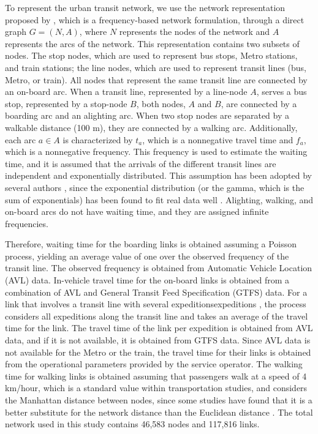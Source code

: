 \documentclass[12pt,a4paper]{article}
\begin{document}
To represent the urban transit network, we use the network representation proposed by \cite{cepeda2006frequency, spiess1989optimal}, which is a frequency-based network formulation, through a direct graph $G=(N,A)$, where $N$ represents the nodes of the network and $A$ represents the arcs of the network. This representation contains two subsets of nodes. The stop nodes, which are used to represent bus stops, Metro stations, and train stations; the line nodes, which are used to represent transit lines (bus, Metro, or train). All nodes that represent the same transit line are connected by an on-board arc. When a transit line, represented by a line-node $A$, serves a bus stop, represented by a stop-node $B$, both nodes, $A$ and $B$, are connected by a boarding arc and an alighting arc. When two stop nodes are separated by a walkable distance (100 m), they are connected by a walking arc. Additionally, each arc $a \in A$ is characterized by $t_{a}$, which is a nonnegative travel time and $f_{a}$, which is a nonnegative frequency. This frequency is used to estimate the waiting time, and it is assumed that the arrivals of the different transit lines are independent and exponentially distributed. This assumption has been adopted by several authors \citep{cepeda2006frequency, spiess1989optimal}, since the exponential distribution (or the gamma, which is the sum of exponentials) has been found to fit real data well \citep{guo2011modelling}. Alighting, walking, and on-board arcs do not have waiting time, and they are assigned infinite frequencies.

Therefore, waiting time for the boarding links is obtained assuming a Poisson process, yielding an average value of one over the observed frequency of the transit line. The observed frequency is obtained from Automatic Vehicle Location (AVL) data. In-vehicle travel time for the on-board links is obtained from a combination of AVL and General Transit Feed Specification (GTFS) data. For a link that involves a transit line with several expeditionsexpeditions , the process considers all expeditions along the transit line and takes an average of the travel time for the link. The travel time of the link per expedition is obtained from AVL data, and if it is not available, it is obtained from GTFS data. Since AVL data is not available for the Metro or the train, the travel time for their links is obtained from the operational parameters provided by the service operator. The walking time for walking links is obtained assuming that passengers walk at a speed of 4 km/hour, which is a standard value within transportation studies, and considers the Manhattan distance between nodes, since some studies have found that it is a better substitute for the network distance than the Euclidean distance \citep{mora2018comparative, tien2011tdplanner}. The total network used in this study contains 46,583 nodes and 117,816 links.
\end{document}
